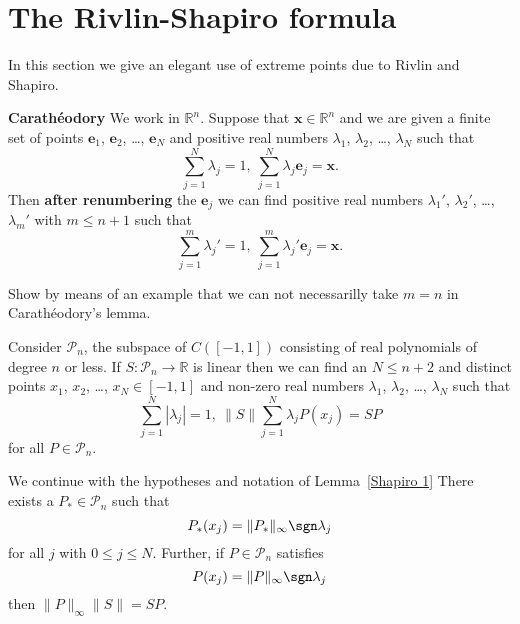 \section{The Rivlin-Shapiro formula} In this section
we give an elegant use of extreme points due to
Rivlin and Shapiro.
\begin{lemma}{\bf Carath\'{e}odory}
We work in ${\mathbb R}^{n}$. Suppose
that ${\mathbf x}\in{\mathbb R}^{n}$ and we are given
a finite set of points ${\mathbf e}_{1}$,
${\mathbf e}_{2}$, \dots, ${\mathbf e}_{N}$ and positive
real numbers $\lambda_{1}$, $\lambda_{2}$, \dots, $\lambda_{N}$
such that
\[\sum_{j=1}^{N}\lambda_{j}=1,
\ \sum_{j=1}^{N}\lambda_{j}{\mathbf e}_{j}={\mathbf x}.\]
Then {\bf after renumbering} the ${\mathbf e}_{j}$
we can find positive
real numbers $\lambda_{1}'$, $\lambda_{2}'$, \dots, $\lambda_{m}'$
with $m\leq n+1$ such that
\[\sum_{j=1}^{m}\lambda_{j}'=1,
\ \sum_{j=1}^{m}\lambda_{j}'{\mathbf e}_{j}={\mathbf x}.\]
\end{lemma}
\begin{added}[Exercise] Show by means of an example
that we can not necessarilly 
take $m=n$ in Carath\'{e}odory's lemma.
\end{added} 
\begin{lemma}\label{Shapiro 1} 
Consider ${\mathcal P}_{n}$, the subspace
of $C([-1,1])$ consisting of real polynomials of degree
$n$ or less. If $S:{\mathcal P}_{n}\rightarrow{\mathbb R}$
is linear then we can find an $N\leq n+2$
and 
distinct points $x_{1}$, $x_{2}$, \dots, $x_{N}\in[-1,1]$
and non-zero
real numbers $\lambda_{1}$, $\lambda_{2}$, \dots, $\lambda_{N}$
such that
\[\sum_{j=1}^{N}|\lambda_{j}|=1,
\ \|S\|\sum_{j=1}^{N}\lambda_{j}P(x_{j})=SP\]
for all $P\in{\mathcal P}_{n}$. 
\end{lemma}
\begin{lemma}\label{Shapiro 2} 
We continue with the hypotheses
and notation of Lemma~\ref{Shapiro 1}
There exists a $P_{*}\in{\mathcal P}_{n}$ such that
\[P_{*}(x_{j})=\|P_{*}\|_{\infty}\sgn\lambda_{j}\]
for all $j$ with $0\leq j\leq N$.
Further, if $P\in{\mathcal P}_{n}$ satisfies
\[P(x_{j})=\|P\|_{\infty}\sgn\lambda_{j}\]
then $\|P\|_{\infty}\|S\|=SP$.
\end{lemma}

